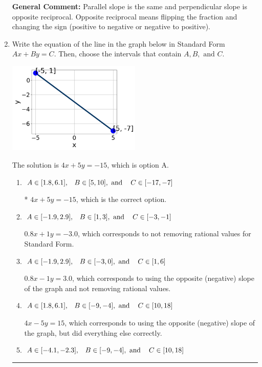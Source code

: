 \documentclass{extbook}[14pt]
\newcommand{\litem}[1]{\item #1

\rule{\textwidth}{0.4pt}}
\begin{document}
\begin{enumerate}
{\textbf{General Comment:} Parallel slope is the same and perpendicular slope is opposite reciprocal. Opposite reciprocal means flipping the fraction and changing the sign (positive to negative or negative to positive).
}
\litem{
Write the equation of the line in the graph below in Standard Form $Ax+By=C$. Then, choose the intervals that contain $A, B, \text{ and } C$.

\begin{center}
    \includegraphics[width=0.5\textwidth]{../Figures/linearGraphToStandardCopyA.png}
\end{center}


The solution is \( 4x + 5y = -15 \), which is option A.\begin{enumerate}[label=\Alph*.]
\item \( A \in [1.8, 6.1], \hspace{3mm} B \in [5, 10], \text{ and } \hspace{3mm} C \in [-17, -7] \)

* $4x + 5y = -15$, which is the correct option.
\item \( A \in [-1.9, 2.9], \hspace{3mm} B \in [1, 3], \text{ and } \hspace{3mm} C \in [-3, -1] \)

 $0.8x + 1y = -3.0$, which corresponds to not removing rational values for Standard Form.
\item \( A \in [-1.9, 2.9], \hspace{3mm} B \in [-3, 0], \text{ and } \hspace{3mm} C \in [1, 6] \)

 $0.8x - 1y = 3.0$, which corresponds to using the opposite (negative) slope of the graph and not removing rational values.
\item \( A \in [1.8, 6.1], \hspace{3mm} B \in [-9, -4], \text{ and } \hspace{3mm} C \in [10, 18] \)

 $4x - 5y = 15$, which corresponds to using the opposite (negative) slope of the graph, but did everything else correctly.
\item \( A \in [-4.1, -2.3], \hspace{3mm} B \in [-9, -4], \text{ and } \hspace{3mm} C \in [10, 18] \)


\end{enumerate}}
\end{enumerate}
\end{document}
